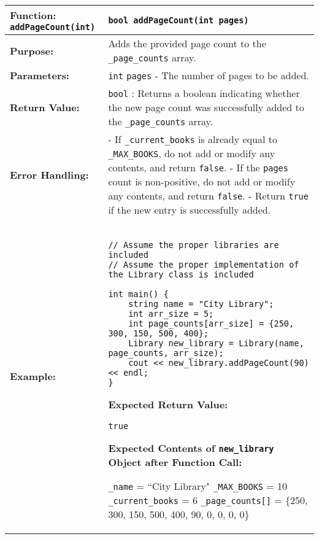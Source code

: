 \renewcommand{\arraystretch}{1.5}
\begin{longtable}{|p{1.7in}|p{4.3in}|}
\hline
\textbf{Function:} \texttt{addPageCount(int)} & \texttt{bool addPageCount(int pages)} \\ \hline

\textbf{Purpose:} & Adds the provided page count to the \texttt{_page_counts} array. \\ \hline

\textbf{Parameters:} & 
\texttt{int} \texttt{pages} - The number of pages to be added. \\ \hline

\textbf{Return Value:} & \texttt{bool} : Returns a boolean indicating whether the new page count was successfully added to the \texttt{_page_counts} array. \\ \hline

\textbf{Error Handling:} & 
- If \texttt{_current_books} is already equal to \texttt{_MAX_BOOKS}, do not add or modify any contents, and return \texttt{false}. \newline
- If the \texttt{pages} count is non-positive, do not add or modify any contents, and return \texttt{false}. \newline
- Return \texttt{true} if the new entry is successfully added. \\ \hline

\textbf{Example:} & 

\begin{example}

\begin{verbatim}

// Assume the proper libraries are included
// Assume the proper implementation of the Library class is included

int main() {
    string name = "City Library";
    int arr_size = 5;
    int page_counts[arr_size] = {250, 300, 150, 500, 400};
    Library new_library = Library(name, page_counts, arr_size);
    cout << new_library.addPageCount(90) << endl;
}
\end{verbatim}
\end{example}

\textbf{Expected Return Value:} 

\vspace{5pt}
\texttt{true} 
\vspace{5pt}

\textbf{Expected Contents of \texttt{new_library} Object after Function Call:} 

\vspace{5pt}
\texttt{_name} = ``City Library" \newline
\texttt{_MAX_BOOKS} = 10 \newline
\texttt{_current_books} = 6 \newline
\texttt{_page_counts[]} = \{250, 300, 150, 500, 400, 90, 0, 0, 0, 0\}
\vspace{5pt} \\ \hline

\end{longtable}
\newpage

